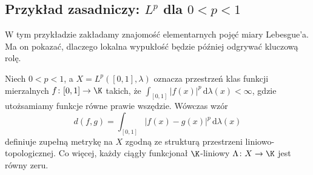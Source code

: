 \subsection{Przykład zasadniczy: \texorpdfstring{$L^p$}{Lp} dla \texorpdfstring{$0<p<1$}{0 < p < 1}}

W tym przykładzie zakładamy znajomość elementarnych pojęć miary
Lebesgue'a. Ma on pokazać, dlaczego lokalna wypukłość będzie
później odgrywać kluczową rolę.

\begin{twierdzenie}\label{thm:lp-trivial-dual}
Niech $0<p<1$, a $X=L^p([0,1],\lambda)$ oznacza przestrzeń
klas funkcji mierzalnych $f\colon[0,1]\to\K$ takich, że
$\int_{[0,1]}|f(x)|^p\,\mathrm d\lambda(x)<\infty$,
gdzie utożsamiamy funkcje równe prawie wszędzie.
Wówczas wzór
\[
 d(f,g)=\int_{[0,1]}|f(x)-g(x)|^p\,\mathrm d\lambda(x)
\]
definiuje zupełną metrykę na $X$ zgodną ze strukturą
przestrzeni liniowo-topologicznej. Co więcej, każdy
ciągły funkcjonał $\K$-liniowy $\Lambda\colon X\to\K$
jest równy zeru.
\end{twierdzenie}
